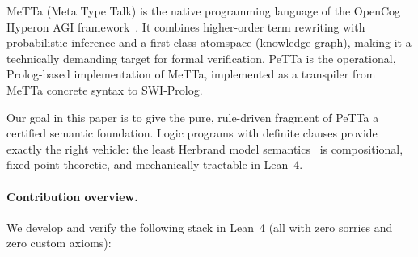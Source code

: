 \documentclass[]{article}
\newcommand{\MeTTa}{\textup{MeTTa}}
\newcommand{\PeTTa}{\textup{PeTTa}}
\begin{document}
\MeTTa{} (Meta Type Talk) is the native programming language of the OpenCog Hyperon
AGI framework~\cite{goertzel2009pln}.  It combines higher-order term rewriting
with probabilistic inference and a first-class atomspace (knowledge graph), making
it a technically demanding target for formal verification.  \PeTTa{} is the
operational, Prolog-based implementation of \MeTTa{}, implemented as a transpiler
from \MeTTa{} concrete syntax to SWI-Prolog.

Our goal in this paper is to give the pure, rule-driven fragment of \PeTTa{} a
certified semantic foundation.  Logic programs with definite clauses provide exactly
the right vehicle: the least Herbrand model semantics~\cite{vanEmdenKowalski1976,Lloyd1987}
is compositional, fixed-point-theoretic, and mechanically tractable in Lean~4.

\paragraph{Contribution overview.}
We develop and verify the following stack in Lean~4 (all with zero sorries and zero
custom axioms):
\end{document}
